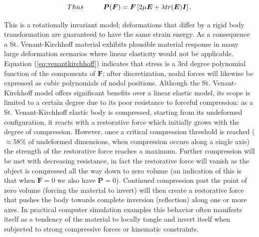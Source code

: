 \begin{equation}
\label{eq:venantkirchhoff}
Thus \hspace{10 mm} \boldsymbol{P}(\boldsymbol{F})=\boldsymbol{F}\left[2\mu\boldsymbol{E}+\lambda tr(\boldsymbol{E})\boldsymbol{I}\right]. 
\end{equation}

This is a rotationally invariant model; deformations that differ by a rigid body transformation are guaranteed to have the same strain energy. As a 
consequence a St. Venant-Kirchhoff material exhibits plausible material response in many large deformation scenarios where linear elasticity would 
not be applicable. Equation (\ref{eq:venantkirchhoff}) indicates that stress is a 3rd degree polynomial function of the components of $\boldsymbol{F}$; 
after discretization, nodal forces will likewise be expressed as cubic polynomials of nodal positions.
Although the St. Venant-Kirchhoff model offers significant benefits over a linear elastic model, its scope is limited to a certain degree due to its 
poor resistance to forceful compression: as a St. Venant-Kirchhoff elastic body is compressed, starting from its undeformed configuration, it reacts 
with a restorative force which initially grows with the degree of compression. However, once a critical compression threshold is reached 
($\approx 58\%$ of undeformed dimensions, when compression occurs along a single axis) the strength of the restorative force reaches a maximum. Further
compression will be met with decreasing resistance, in fact the restorative force will vanish as the object is compressed all the way down to zero volume 
(an indication of this is that when $\boldsymbol{F} = 0$ we also have $\boldsymbol{P} = 0$). Continued compression past the point of zero volume (forcing the material to invert) will 
then create a restorative force that pushes the body towards complete inversion (reflection) along one or more axes. In practical computer simulation 
examples this behavior often manifests itself as a tendency of the material to locally tangle and invert itself when subjected to strong compressive forces 
or kinematic constraints.

 
